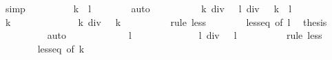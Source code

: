 \begin{isabellebody}
\ simp\isanewline
\ \ \ \ \isamarkupfalse%
\ \isamarkupfalse%
\ {\isacartoucheopen}{}\ {\isacharless}{\kern0pt}\ {\isasymbar}k{\isasymbar}\ {\isacharplus}{\kern0pt}\ {\isasymbar}l{\isasymbar}{\isacartoucheclose}\isanewline
\ \ \ \ \ \ \isamarkupfalse%
\ auto\isanewline
\ \ \ \ \isamarkupfalse%
\ \isamarkupfalse%
\ {\isacharasterisk}{\kern0pt}\ \isamarkupfalse%
\ {\isacartoucheopen}{\isasymbar}k\ div\ {}{\isasymbar}\ {\isacharplus}{\kern0pt}\ {\isasymbar}l\ div\ {}{\isasymbar}\ {\isacharless}{\kern0pt}\ {\isasymbar}k{\isasymbar}\ {\isacharplus}{\kern0pt}\ {\isasymbar}l{\isasymbar}{\isacartoucheclose}\isanewline
\ \ \ \ \isamarkupfalse%
\isanewline
\ \ \ \ \ \ \isamarkupfalse%
\ {\isacartoucheopen}k\ {\isasymnotin}\ {\isacharbraceleft}{\kern0pt}{}{\isacharcomma}{\kern0pt}\ {\isacharminus}{\kern0pt}\ {}{\isacharbraceright}{\kern0pt}{\isacartoucheclose}\isanewline
\ \ \ \ \ \ \isamarkupfalse%
\ \isamarkupfalse%
\ {\isacartoucheopen}{\isasymbar}k\ div\ {}{\isasymbar}\ {\isacharless}{\kern0pt}\ {\isasymbar}k{\isasymbar}{\isacartoucheclose}\isanewline
\ \ \ \ \ \ \ \ \isamarkupfalse%
\ {\isacharparenleft}{\kern0pt}rule\ less{\isacharparenright}{\kern0pt}\isanewline
\ \ \ \ \ \ \isamarkupfalse%
\ less{\isacharunderscore}{\kern0pt}eq\ {\isacharbrackleft}{\kern0pt}of\ l{\isacharbrackright}{\kern0pt}\ \isamarkupfalse%
\ {\isacharquery}{\kern0pt}thesis\isanewline
\ \ \ \ \ \ \ \ \isamarkupfalse%
\ auto\isanewline
\ \ \ \ \isamarkupfalse%
\isanewline
\ \ \ \ \ \ \isamarkupfalse%
\ {\isacartoucheopen}l\ {\isasymnotin}\ {\isacharbraceleft}{\kern0pt}{}{\isacharcomma}{\kern0pt}\ {\isacharminus}{\kern0pt}\ {}{\isacharbraceright}{\kern0pt}{\isacartoucheclose}\isanewline
\ \ \ \ \ \ \isamarkupfalse%
\ \isamarkupfalse%
\ {\isacartoucheopen}{\isasymbar}l\ div\ {}{\isasymbar}\ {\isacharless}{\kern0pt}\ {\isasymbar}l{\isasymbar}{\isacartoucheclose}\isanewline
\ \ \ \ \ \ \ \ \isamarkupfalse%
\ {\isacharparenleft}{\kern0pt}rule\ less{\isacharparenright}{\kern0pt}\isanewline
\ \ \ \ \ \ \isamarkupfalse%
\ less{\isacharunderscore}{\kern0pt}eq\ {\isacharbrackleft}{\kern0pt}of\ k{\isacharbrackright}{\kern0pt}\ \isamarkupfalse%

\end{isabellebody}
